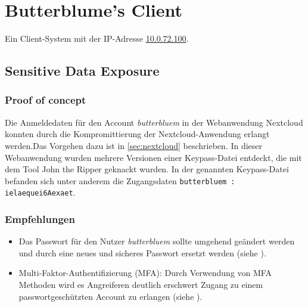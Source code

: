\chapter{Butterblume's Client}
Ein Client-System mit der IP-Adresse \url{10.0.72.100}.

\section{\makecvssbadge Sensitive Data Exposure}

\subsection*{Proof of concept} 
Die Anmeldedaten für den Account \textit{butterbluem} in der Webanwendung Nextcloud konnten durch die Kompromittierung der Nextcloud-Anwendung erlangt werden.Das Vorgehen dazu ist in \autoref{sec:nextcloud} beschrieben. In dieser Webanwendung wurden mehrere Versionen einer Keypass-Datei entdeckt, die mit dem Tool John the Ripper geknackt wurden. In der genannten Keypass-Datei befanden sich unter anderem die Zugangsdaten \texttt{butterbluem : ielaequei6Aexaet}.

\subsection*{Empfehlungen}
\begin{itemize}
    \item Das Passwort für den Nutzer \textit{butterbluem} sollte umgehend geändert werden und durch eine neues und sicheres Passwort ersetzt werden (siehe \cite{bsi_passwords}).
    \item Multi-Faktor-Authentifizierung (MFA): Durch Verwendung von MFA Methoden wird es Angreiferen deutlich erschwert Zugang zu einem passwortgeschützten Account zu erlangen (siehe \cite{owaspAuthenticationOWASP}).
\end{itemize}


